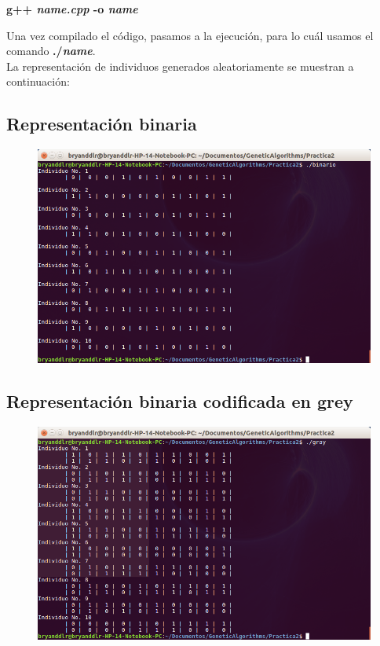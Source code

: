 \documentclass[11pt,letterpaper]{article}
\begin{document}
\begin{center}
	\textbf{g++ \textit{name.cpp} -o \textit{name}}
\end{center}
	
Una vez compilado el código, pasamos a la ejecución, para lo cuál usamos el comando  \textbf{./\textit{name}}.\\

La representación de individuos generados aleatoriamente se muestran a continuación:\\

\subsection*{Representación binaria}

\begin{figure}[H]
	\centering
	\includegraphics[scale = 0.5]{images/ej1}
\end{figure}

\subsection*{Representación binaria codificada en grey}
\begin{figure}[H]
	\centering
	\includegraphics[scale = 0.5]{images/ej2}
\end{figure}
\end{document}
